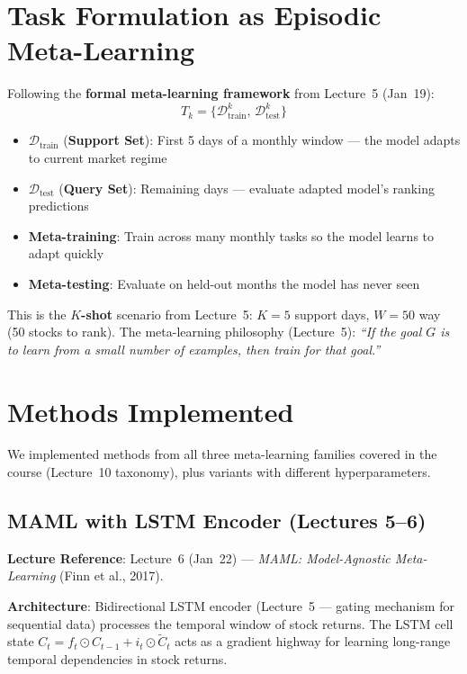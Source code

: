 \documentclass[11pt,a4paper]{article}
\begin{document}
\section{Task Formulation as Episodic Meta-Learning}

Following the \textbf{formal meta-learning framework} from Lecture~5 (Jan~19):
\begin{equation}
    T_k = \{\mathcal{D}_{\text{train}}^k, \, \mathcal{D}_{\text{test}}^k\}
\end{equation}

\begin{itemize}[nosep]
    \item $\mathcal{D}_{\text{train}}$ (\textbf{Support Set}): First 5 days of a monthly window --- the model adapts to current market regime
    \item $\mathcal{D}_{\text{test}}$ (\textbf{Query Set}): Remaining days --- evaluate adapted model's ranking predictions
    \item \textbf{Meta-training}: Train across many monthly tasks so the model learns to adapt quickly
    \item \textbf{Meta-testing}: Evaluate on held-out months the model has never seen
\end{itemize}

This is the \textbf{$K$-shot} scenario from Lecture~5: $K\!=\!5$ support days, $W\!=\!50$ way (50 stocks to rank). The meta-learning philosophy (Lecture~5): \emph{``If the goal $G$ is to learn from a small number of examples, then train for that goal.''}

\section{Methods Implemented}

We implemented methods from all three meta-learning families covered in the course (Lecture~10 taxonomy), plus variants with different hyperparameters.

\subsection{MAML with LSTM Encoder \textnormal{(Lectures 5--6)}}

\textbf{Lecture Reference}: Lecture~6 (Jan~22) --- \emph{MAML: Model-Agnostic Meta-Learning} (Finn et al., 2017).

\textbf{Architecture}: Bidirectional LSTM encoder (Lecture~5 --- gating mechanism for sequential data) processes the temporal window of stock returns. The LSTM cell state $C_t = f_t \odot C_{t-1} + i_t \odot \tilde{C}_t$ acts as a gradient highway for learning long-range temporal dependencies in stock returns.
\end{document}
